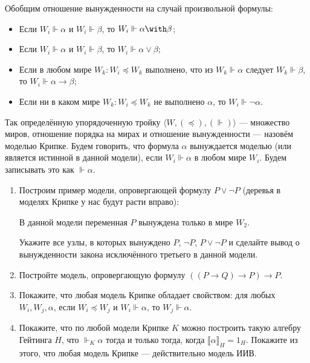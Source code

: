 \documentclass[10pt,a4paper,oneside]{article}
\begin{document}
\begin{enumerate}
Обобщим отношение вынужденности на случай произвольной формулы:
\begin{itemize}
\item Если $W_i \Vdash \alpha$ и $W_i \Vdash \beta$, то $W_i \Vdash \alpha\with\beta$;
\item Если $W_i \Vdash \alpha$ и $W_i \Vdash \beta$, то $W_i \Vdash \alpha\vee\beta$;
\item Если в любом мире $W_k: W_i \preceq W_k$ выполнено, что из $W_k \Vdash \alpha$ следует $W_k \Vdash \beta$, 
то $W_i \Vdash \alpha\rightarrow\beta$;
\item Если ни в каком мире $W_k: W_i \preceq W_k$ не выполнено $\alpha$, то $W_i \Vdash \neg\alpha$.
\end{itemize}

Так определённую упорядоченную тройку $\langle W, (\preceq), (\Vdash) \rangle$ --- множество миров, отношение 
порядка на мирах и отношение вынужденности --- назовём моделью Крипке.
Будем говорить, что формула $\alpha$ вынуждается моделью (или является истинной в данной модели),
если $W_i \Vdash \alpha$ в любом мире $W_i$. Будем записывать это как $\Vdash \alpha$.

\begin{enumerate}
\item Построим пример модели, опровергающей формулу $P \vee\neg P$
(деревья в моделях Крипке у нас будут расти вправо):
\begin{center}\end{center}

В данной модели переменная $P$ вынуждена только в мире $W_2$.

Укажите все узлы, в которых вынуждено $P$, $\neg P$, $P \vee\neg P$ и сделайте вывод о вынужденности
закона исключённого третьего в данной модели.

\item Постройте модель, опровергающую формулу $((P\rightarrow Q)\rightarrow P)\rightarrow P$.

\item Покажите, что любая модель Крипке обладает свойством: для любых $W_i, W_j, \alpha$, 
если $W_i \preceq W_j$ и $W_i \Vdash \alpha$, то $W_j \Vdash \alpha$.

\item Покажите, что по любой модели Крипке $K$ можно построить такую алгебру Гейтинга $H$, что
$\Vdash_K \alpha$ тогда и только тогда, когда $\llbracket\alpha\rrbracket_H = 1_H$. 
Покажите из этого, что любая модель Крипке --- действительно модель ИИВ.


\end{enumerate}
\end{enumerate}
\end{document}
